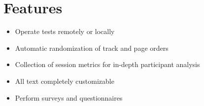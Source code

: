 \vspace{-0.8cm}
\section{Features}

\begin{itemize}[noitemsep,nolistsep]
\item Operate tests remotely or locally
	\item Automatic randomization of track and page orders
	\item Collection of session metrics for in-depth participant analysis
	\item All text completely customizable
	\item Perform surveys and questionnaires
\end{itemize}


